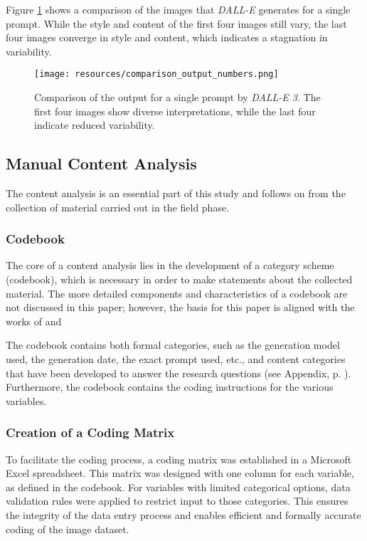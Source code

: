 Figure \ref{fig:ai_outputs} shows a comparison of the images that \textit{DALL-E} generates for a single prompt. While the style and content of the first four images still vary, the last four images converge in style and content, which indicates a stagnation in variability.


\begin{figure}[h]
\centering
\texttt{[image: resources/comparison\_output\_numbers.png]}
\caption[AI Model Image Variability]{Comparison of the output for a single prompt by \textit{DALL-E 3}. The first four images show diverse interpretations, while the last four indicate reduced variability.}
\label{fig:ai_outputs}
\end{figure}

\subsection{Manual Content Analysis}
\label{subsec:manual-content-analysis}

The content analysis is an essential part of this study and follows on from the collection of material carried out in the field phase. 

\subsubsection{Codebook}
\label{subsubsec:codebook}

The core of a content analysis lies in the development of a category scheme (codebook), which is necessary in order to make statements about the collected material. The more detailed components and characteristics of a codebook are not discussed in this paper; however, the basis for this paper is aligned with the works of \textcite[153-]{Brosius2016} and \textcite[373--]{Schnell2018}

The codebook contains both formal categories, such as the generation model used, the generation date, the exact prompt used, etc., and content categories that have been developed to answer the research questions  (see Appendix, p. \pageref{appendix:codebook}). Furthermore, the codebook contains the coding instructions for the various variables.

\subsubsection{Creation of a Coding Matrix}
\label{subsubsec:creation-coding-matrix}
To facilitate the coding process, a coding matrix was established in a Microsoft Excel spreadsheet. This matrix was designed with one column for each variable, as defined in the codebook. For variables with limited categorical options, data validation rules were applied to restrict input to those categories. This ensures the integrity of the data entry process and enables efficient and formally accurate coding of the image dataset.

